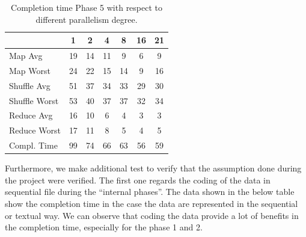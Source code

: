 \begin{table}[h!]
\begin{center}
\begin{tabular}{ | l || c | c | c | c |  c | c | }

  \hline      
   						& 1 		& 2 		& 4 		& 8 		&16 		& 21 \\
  \hline      \hline
  Map Avg 		& 19 	& 14 	& 11 	& 9 		& 6 		& 9   \\
  Map Worst 		& 24 	& 22 	& 15		& 14 	& 9 		& 16  	\\
  \hline
  Shuffle Avg 	& 51 	& 37 	& 34 	& 33 	& 29 	& 30   \\ 
  Shuffle Worst 	& 53 	& 40 	& 37 	& 37 	& 32 	& 34   \\
  \hline
  Reduce Avg	& 16 	& 10 	& 6 		& 4 		& 3 		& 3     \\
  Reduce Worst	& 17 	& 11 	& 8 		& 5 		& 4 		& 5     \\
  \hline  
  Compl. Time &	99	&	74	&	66	&	63	&	56	&	59	\\
  \hline


\end{tabular} 
  \end{center}
    \label{tab:Phase 5}
\caption{Completion time Phase 5 with respect to different parallelism degree.}
\end{table}






Furthermore, we make additional test to verify that the assumption done during the project were verified. The first one regards the coding of the data in sequential file during the ``internal phases''. The data shown in the below table show the completion time in the case the data are represented in the sequential or textual way. We can observe that coding the data provide a lot of benefits in the completion time, especially for the phase 1 and 2.

